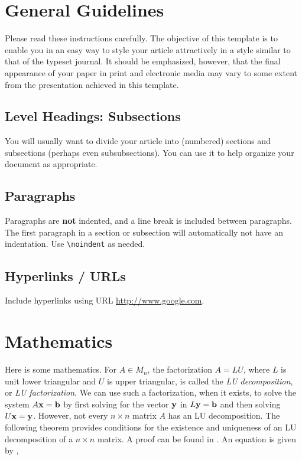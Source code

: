 \section{General Guidelines}

\noindent 
Please read these instructions carefully.   
The objective of this template is to enable you in an easy way to style your article attractively in a style similar to that of the typeset journal. 
It should be emphasized, however, that the final appearance of your paper in print and electronic media may vary to some extent from the presentation achieved in this template.


\subsection{Level Headings: Subsections}
\noindent 
You will usually want to divide your article into (numbered) sections and subsections (perhaps even subsubsections).  
You can use it to help organize your document as appropriate.


\subsection{Paragraphs}
\noindent 
Paragraphs are \textbf{not} indented, and a line break is included between paragraphs.  
The first paragraph in a section or subsection will automatically  not  have an indentation.  
Use \verb!\noindent! as needed.  


\subsection{Hyperlinks / URLs} 
Include hyperlinks using URL \url{http://www.google.com}.  


\section{Mathematics}\label{sec:lu}
Here is some mathematics.  
For $A \in M_n$, the factorization $A = LU$, where $L$ is unit lower triangular and $U$ is upper triangular, is called the \textit{LU decomposition}, or \textit{LU factorization}.  
We can use such a factorization, when it exists, to solve the system $A {\bf x} = {\bf b}$ by first solving for the vector $\bf{y}$ in $L {\bf y} = {\bf b}$ and then solving 
$
U {\bf x} = {\bf y}
$. 
However, not every $n \times n$ matrix $A$ has an LU decomposition.  
The following theorem provides conditions for the existence and uniqueness of an LU decomposition of a $n \times n$ matrix.  
A proof can be found in \citet[p. 160]{johnson1985matrix}.  
An equation is given by \cite{strang1993introduction}, 

